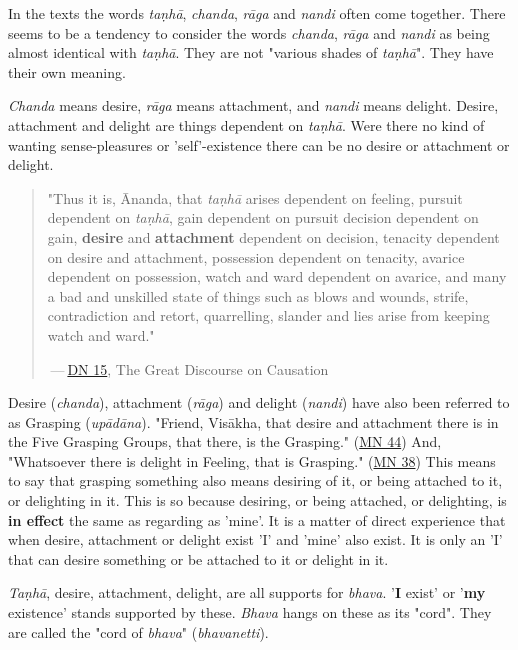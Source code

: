 In the texts the words \emph{taṇhā}, \emph{chanda}, \emph{rāga} and \emph{nandi} often come together. There seems to be a tendency to consider the words \emph{chanda}, \emph{rāga} and \emph{nandi} as being almost identical with \emph{taṇhā}. They are not "various shades of \emph{taṇhā}". They have their own meaning.

\emph{Chanda} means desire, \emph{rāga} means attachment, and \emph{nandi} means delight. Desire, attachment and delight are things dependent on \emph{taṇhā}. Were there no kind of wanting sense-pleasures or 'self'-existence there can be no desire or attachment or delight.

\begin{quote}
"Thus it is, Ānanda, that \emph{taṇhā} arises dependent on feeling, pursuit dependent on \emph{taṇhā}, gain dependent on pursuit decision dependent on gain, \textbf{desire} and \textbf{attachment} dependent on decision, tenacity dependent on desire and attachment, possession dependent on tenacity, avarice dependent on possession, watch and ward dependent on avarice, and many a bad and unskilled state of things such as blows and wounds, strife, contradiction and retort, quarrelling, slander and lies arise from keeping watch and ward."

 --- \href{https://suttacentral.net/dn15/en/bodhi}{DN 15}, The Great Discourse on Causation
\end{quote}

Desire (\emph{chanda}), attachment (\emph{rāga}) and delight (\emph{nandi}) have also been referred to as Grasping (\emph{upādāna}). "Friend, Visākha, that desire and attachment there is in the Five Grasping Groups, that there, is the Grasping." (\href{https://suttacentral.net/mn44/en/sujato}{MN 44}) And, "Whatsoever there is delight in Feeling, that is Grasping." (\href{https://suttacentral.net/mn38/en/bodhi}{MN 38}) This means to say that grasping something also means desiring of it, or being attached to it, or delighting in it. This is so because desiring, or being attached, or delighting, is \textbf{in effect} the same as regarding as 'mine'. It is a matter of direct experience that when desire, attachment or delight exist 'I' and 'mine' also exist. It is only an 'I' that can desire something or be attached to it or delight in it.

\emph{Taṇhā}, desire, attachment, delight, are all supports for \emph{bhava}. '\textbf{I} exist' or '\textbf{my} existence' stands supported by these. \emph{Bhava} hangs on these as its "cord". They are called the "cord of \emph{bhava}" (\emph{bhavanetti}).

